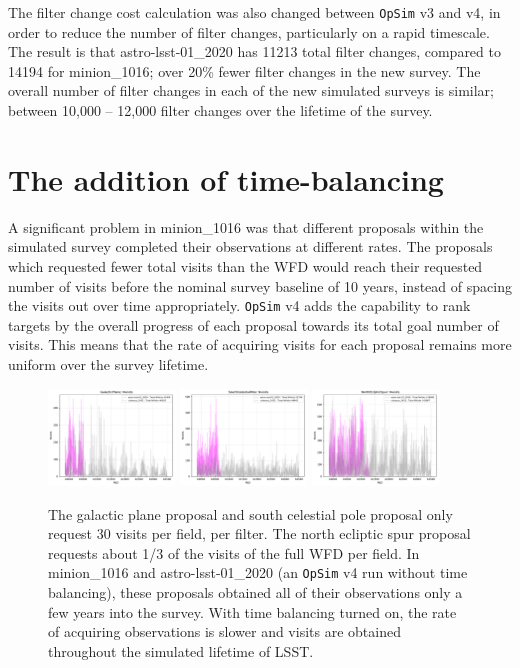 \documentclass[DM,lsstdraft,authoryear,toc]{lsstdoc}
\newcommand{\opsim}{\texttt{OpSim}\xspace}
\begin{document}
The filter change cost calculation was also changed between \opsim v3 and v4, in order to reduce the number of filter changes, particularly on a rapid timescale. The result is that astro-lsst-01\_2020 has 11213 total filter changes, compared to 14194 for minion\_1016; over 20\% fewer filter changes in the new survey. The overall number of filter changes in each of the new simulated surveys is similar; between 10,000 -- 12,000 filter changes over the lifetime of the survey. 

\section{The addition of time-balancing}

A significant problem in minion\_1016 was that different proposals within the simulated survey completed their observations at different rates. The proposals which requested fewer total visits than the WFD would reach their requested number of visits before the nominal survey baseline of 10 years, instead of spacing the visits out over time appropriately. \opsim v4 adds the capability to rank targets by the overall progress of each proposal towards its total goal number of visits. This means that the rate of acquiring visits for each proposal remains more uniform over the survey lifetime. 

\begin{figure}[ht]
\centering
\includegraphics[width=0.3\textwidth]{figures/timebalancing_gp}
\includegraphics[width=0.3\textwidth]{figures/timebalancing_scp}
\includegraphics[width=0.3\textwidth]{figures/timebalancing_nes}
\caption{The galactic plane proposal and south celestial pole proposal only request 30 visits per field, per filter. The north ecliptic spur proposal requests about 1/3 of the visits of the full WFD per field. In minion\_1016 and astro-lsst-01\_2020 (an \opsim v4 run without time balancing), these proposals obtained all of their observations only a few years into the survey. With time balancing turned on, the rate of acquiring observations is slower and visits are obtained throughout the simulated lifetime of LSST.
\label{fig:timebalancing}}
\end{figure}
\end{document}
